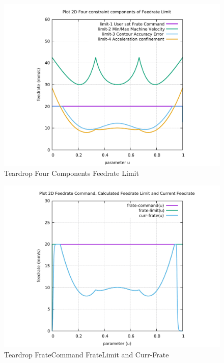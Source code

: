 \begin{figure}
	\caption     {Teardrop Four Components Feedrate Limit}
	\label{10-img-Teardrop-Four-Components-Feedrate-Limit.pdf}
	\includegraphics[width=1.00\textwidth]{Chap4/appendix/app-Teardrop/plots/10-img-Teardrop-Four-Components-Feedrate-Limit.pdf}
\end{figure}

\clearpage
\pagebreak

\begin{figure}
	\caption     {Teardrop FrateCommand FrateLimit and Curr-Frate}
	\label{11-img-Teardrop-FrateCommand-FrateLimit-and-Curr-Frate.pdf}
	\includegraphics[width=1.00\textwidth]{Chap4/appendix/app-Teardrop/plots/11-img-Teardrop-FrateCommand-FrateLimit-and-Curr-Frate.pdf}
\end{figure}

